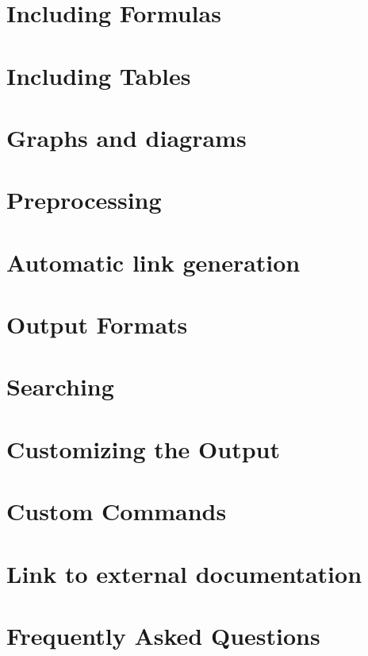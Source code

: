 \documentclass{book}
\newcommand{\+}{\discretionary{\mbox{\scriptsize$\hookleftarrow$}}{}{}}
\begin{document}
\chapter{Including Formulas}\label{formulas}\hypertarget{formulas}{}
\chapter{Including Tables}\label{tables}\hypertarget{tables}{}
\chapter{Graphs and diagrams}\label{diagrams}\hypertarget{diagrams}{}
\chapter{Preprocessing}\label{preprocessing}\hypertarget{preprocessing}{}
\chapter{Automatic link generation}\label{autolink}\hypertarget{autolink}{}
\chapter{Output Formats}\label{output}\hypertarget{output}{}
\chapter{Searching}\label{searching}\hypertarget{searching}{}
\chapter{Customizing the Output}\label{customize}\hypertarget{customize}{}
\chapter{Custom Commands}\label{custcmd}\hypertarget{custcmd}{}
\chapter{Link to external documentation}\label{external}\hypertarget{external}{}
\chapter{Frequently Asked Questions}\label{faq}\hypertarget{faq}{}
\end{document}

